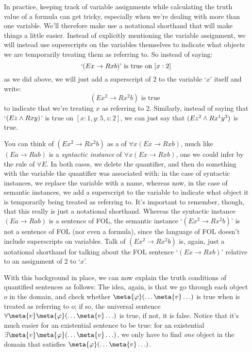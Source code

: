 In practice, keeping track of variable assignments while calculating the truth value of a formula can get tricky, especially when we're dealing with more than one variable.  We'll therefore make use a notational shorthand that will make things a little easier.  Instead of explicitly mentioning the variable assignment, we will instead use superscripts on the variables themselves to indicate what objects we are temporarily treating them as referring to.  So instead of saying:
$$`(Ex \rightarrow Rxb) \text{' is true on } [x:2]$$
as we did above, we will just add a superscript of $2$ to the variable `$x$' itself and write:
$$(Ex^2 \rightarrow Rx^2b) \text{ is true }$$
to indicate that we're treating $x$ as referring to 2.  Similarly, instead of saying that `$(Ez \wedge Rxy)$' is true on $[x: 1, y:5, z:2]$, we can just say that $(Ez^2 \wedge Rx^1y^3)$ is true.

You can think of $(Ex^2 \rightarrow Rx^2b)$ as a  of $\forall x(Ex \rightarrow Rxb)$, much like $(Ea \rightarrow Rab)$ is a \emph{syntactic instance} of $\forall x(Ex \rightarrow Rxb)$, one we could infer by the rule of $\forall E$.  In both cases, we delete the quantifier, and then do something with the variable the quantifier was associated with: in the case of syntactic instances, we replace the variable with a name, whereas now, in the case of semantic instances, we add a superscript to the variable to indicate what object it is temporarily being treated as referring to.  It's important to remember, though, that this really is just a notational shorthand.  Whereas the syntactic instance $(Ea \rightarrow Rab)$ is a sentence of FOL, the semantic instance `$(Ex^2 \rightarrow Rx^2b)$' is not a sentence of FOL (nor even a formula), since the language of FOL doesn't include superscripts on variables.  Talk of $(Ex^2 \rightarrow Rx^2b)$ is, again, just a notational shorthand for talking about the FOL sentence `$(Ex \rightarrow Rxb)$' relative to an assignment of 2 to `$x$'.

With this background in place, we can now explain the truth conditions of quantified sentences as follows:
The idea, again, is that we go through each object $o$ in the domain, and check whether $\meta{\varphi}(\ldots \meta{v} \ldots)$ is true when  is treated as referring to $o$; if so, the universal sentence $\forall \meta{v}\meta{\varphi}(\ldots \meta{v} \ldots)$ is true, if not, it is false.  Notice that it's much easier for an existential sentence to be true: for an existential $\exists \meta{v}\meta{\varphi}(\ldots \meta{v} \ldots)$, we only have to find \emph{one} object in the domain that satisfies $\meta{\varphi}(\ldots \meta{v} \ldots)$.


